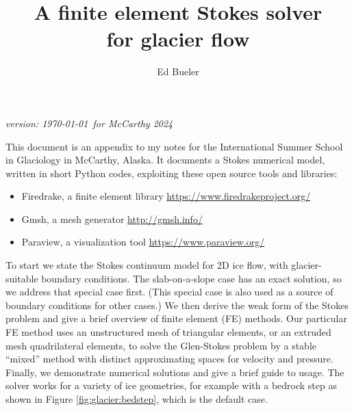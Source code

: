 \documentclass[letterpaper,final,12pt,reqno]{amsart}
\begin{document}
\graphicspath{{figures/}}

\title[FE Stokes solver for glacier flow]{A finite element Stokes solver \\ for glacier flow}

\author{Ed Bueler}

\maketitle

\vspace{-8mm}
\begin{center}
\footnotesize
\emph{version: \today~for McCarthy 2024}
\end{center}

\thispagestyle{empty}
\bigskip


This document is an appendix to my notes for the International Summer School in Glaciology in McCarthy, Alaska.  It documents a Stokes numerical model, written in short Python codes, exploiting these open source tools and libraries:
\begin{itemize}
\item Firedrake, a finite element library \hfill \url{https://www.firedrakeproject.org/}
\item Gmsh, a mesh generator \hfill \url{http://gmsh.info/}
\item Paraview, a visualization tool \hfill \url{https://www.paraview.org/}
\end{itemize}

To start we state the Stokes continuum model for 2D ice flow, with glacier-suitable boundary conditions.  The slab-on-a-slope case has an exact solution, so we address that special case first.  (This special case is also used as a source of boundary conditions for other cases.)  We then derive the weak form of the Stokes problem and give a brief overview of finite element (FE) methods.  Our particular FE method uses an unstructured mesh of triangular elements, or an extruded mesh quadrilateral elements, to solve the Glen-Stokes problem by a stable ``mixed'' method with distinct approximating spaces for velocity and pressure.  Finally, we demonstrate numerical solutions and give a brief guide to usage.  The solver works for a variety of ice geometries, for example with a bedrock step as shown in Figure \ref{fig:glacier:bedstep}, which is the default case.
\end{document}
